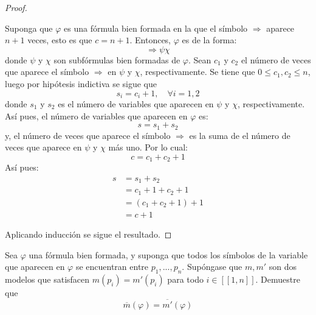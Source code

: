 \documentclass[12pt]{report}
\theoremstyle{largebreak}
\newcommand\natint[1]{\ensuremath{\left[\!\left[ #1\right]\!\right]}}
\begin{document}
\begin{proof}
\begin{itemize}
            Suponga que $\varphi$ es una fórmula bien formada en la que el símbolo $\Rightarrow$ aparece $n+1$ veces, esto es que $c=n+1$. Entonces, $\varphi$ es de la forma:
            \begin{equation*}
                \Rightarrow\psi\chi
            \end{equation*}
            donde $\psi$ y $\chi$ son subfórmulas bien formadas de $\varphi$. Sean $c_1$ y $c_2$ el número de veces que aparece el símbolo $\Rightarrow$ en $\psi$ y $\chi$, respectivamente. Se tiene que $0\leq c_1,c_2\leq n$, luego por hipótesis indictiva se sigue que
            \begin{equation*}
                s_i=c_i+1,\quad\forall i=1,2
            \end{equation*}
            donde $s_1$ y $s_2$ es el número de variables que aparecen en $\psi$ y $\chi$, respectivamente. Así pues, el número de variables que aparecen en $\varphi$ es:
            \begin{equation*}
                s=s_1+s_2
            \end{equation*}
            y, el número de veces que aparece el símbolo $\Rightarrow$ es la suma de el número de veces que aparece en $\psi$ y $\chi$ más uno. Por lo cual:
            \begin{equation*}
                c=c_1+c_2+1
            \end{equation*}
            Así pues:
            \begin{equation*}
                \begin{split}
                    s&=s_1+s_2\\
                    &=c_1+1+c_2+1\\
                    &=(c_1+c_2+1)+1\\
                    &=c+1
                \end{split}
            \end{equation*}
        \end{itemize}
        Aplicando inducción se sigue el resultado.
    \end{proof}

    \begin{excer}
        Sea $\varphi$ una fórmula bien formada, y suponga que todos los símbolos de la variable que aparecen en $\varphi$ se encuentran entre $p_1,...,p_n$. Supóngase que $m,m'$ son dos modelos que satisfacen $m(p_i)=m'(p_i)$ para todo $i\in\natint{1,n}$. Demuestre que
        \begin{equation*}
            \overline{m}(\varphi)=\overline{m'}(\varphi)
        \end{equation*}
    \end{excer}
\end{document}
